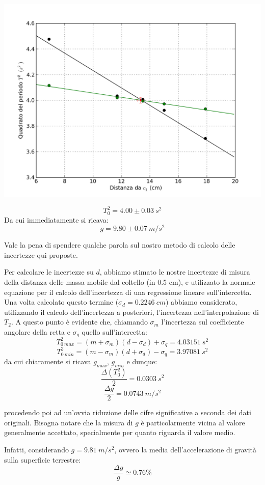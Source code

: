 \begin{center}
\includegraphics[scale=0.70]{../grafici/kater/intersezione.png}
\end{center}

$$T_0^2 = 4.00\pm 0.03\ s^2$$
Da cui immediatamente si ricava:
$$g = 9.80 \pm 0.07\ m/s^2$$

Vale la pena di spendere qualche parola sul nostro metodo di calcolo delle incertezze qui proposte.

Per calcolare le incertezze su $d$, abbiamo stimato le nostre incertezze di misura della distanza delle massa mobile dal coltello (in 0.5 cm), e utilizzato la normale equazione per il calcolo dell'incertezza di una regressione lineare sull'intercetta.
Una volta calcolato questo termine ($\sigma_d = 0.2246\ cm$) abbiamo considerato, utilizzando il calcolo dell'incertezza a posteriori, l'incertezza nell'interpolazione di $T_2$. A questo punto è evidente che, chiamando $\sigma_m$ l'incertezza sul coefficiente angolare della retta e $\sigma_q$ quello sull'intercetta:
$$T^2_{0\ max} = (m+\sigma_m)(d-\sigma_d) + \sigma_q = 4.03151\ s^2$$
$$T^2_{0\ min} = (m-\sigma_m)(d+\sigma_d) - \sigma_q = 3.97081\ s^2$$
da cui chiaramente si ricava $g_{max}$, $g_{min}$ e dunque:
$$\frac{\Delta (T_0^2)}{2} = 0.0303\ s^2$$
$$\frac{\Delta g}{2} = 0.0743\ m/s^2 $$

procedendo poi ad un'ovvia riduzione delle cifre significative a seconda dei dati originali. Bisogna notare che la misura di $g$ è particolarmente vicina al valore generalmente accettato, specialmente per quanto riguarda il valore medio.

Infatti, considerando $g=9.81\ m/s^2$, ovvero la media dell'accelerazione di gravità sulla superficie terrestre:
$$\frac{\Delta g}{g} \simeq 0.76\% $$


